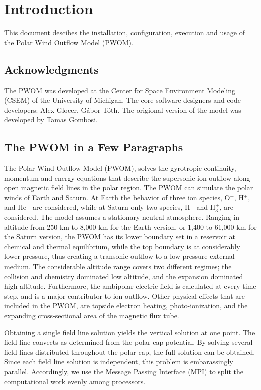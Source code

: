 
\chapter{Introduction}

This document descibes the installation, configuration, execution and 
usage of the Polar Wind Outflow Model (PWOM).

\section{Acknowledgments}

The PWOM was developed at the Center for Space Environment Modeling
(CSEM) of the University of Michigan. 
The core software designers and code developers: Alex Glocer, G\'abor T\'oth. 
The origional version of the model was developed by Tamas Gombosi.

\section{The PWOM in a Few Paragraphs}

The Polar Wind Outflow Model (PWOM), solves the gyrotropic continuity, 
momentum and energy equations that describe the supersonic ion outflow 
along open magnetic field lines in the polar region. The PWOM can simulate 
the polar winds of Earth and Saturn. At Earth the behavior of three ion 
species, O$^{+}$, H$^{+}$, and He$^{+}$ are considered, while at Saturn 
only two species, H$^{+}$ and H$_{3}^{+}$, are considered. The model assumes 
a stationary neutral atmosphere. Ranging in altitude from 250 km to 8,000 km 
for the Earth version, or 1,400 to 61,000 km for the Saturn version, the PWOM 
has its lower boundary set in a reservoir at chemical and thermal equilibrium, 
while the top boundary is at considerably lower pressure, thus creating a 
transonic outflow to a low pressure external medium. The considerable 
altitude range covers two different regimes; the collision and chemistry 
dominated low altitude, and the expansion dominated high altitude. 
Furthermore, the ambipolar electric field is calculated at every time step, 
and is a major contributor to ion outflow. Other physical effects that are 
included in the PWOM, are topside electron heating, photo-ionization, and the 
expanding cross-sectional area of the magnetic flux tube.

Obtaining a single field line solution yields the vertical solution at one 
point. The field line convects as determined from the polar cap potential. 
By solving several field lines distributed  throughout the polar cap, 
the full solution can be obtained. Since each field line solution is 
independent, this problem is embarassingly parallel. Accordingly, 
we use the Message Passing Interface (MPI) to split the computational work 
evenly among processors. 

